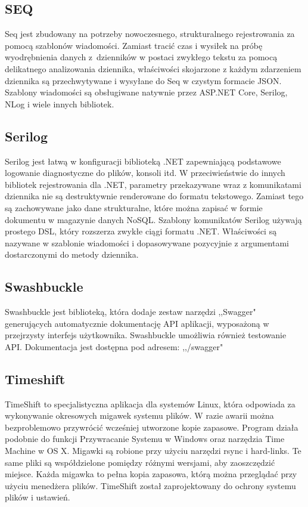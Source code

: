 \documentclass[12pt,a4paper]{article}
\begin{document}
		\subsection{SEQ}
			\indent Seq jest zbudowany na potrzeby nowoczesnego, strukturalnego rejestrowania za pomocą szablonów wiadomości. Zamiast tracić czas i wysiłek na próbę
				wyodrębnienia danych z~dzienników w postaci zwykłego tekstu za pomocą delikatnego analizowania dziennika, właściwości skojarzone z każdym zdarzeniem
				dziennika są przechwytywane i wysyłane do Seq w czystym formacie JSON. Szablony wiadomości są obsługiwane natywnie przez ASP.NET Core, Serilog, NLog
				i wiele innych bibliotek. 

		\subsection{Serilog}
			\indent Serilog jest łatwą w konfiguracji biblioteką .NET zapewniającą podstawowe logowanie diagnostyczne do plików, konsoli itd. W przeciwieństwie do innych bibliotek
				rejestrowania dla .NET, parametry przekazywane wraz z komunikatami dziennika nie są destruktywnie renderowane do formatu tekstowego. Zamiast tego są zachowywane
				jako dane strukturalne, które można zapisać w formie dokumentu w magazynie danych NoSQL. Szablony komunikatów Serilog używają prostego DSL, który rozszerza
				zwykłe ciągi formatu .NET. Właściwości są nazywane w szablonie wiadomości i dopasowywane pozycyjnie z argumentami dostarczonymi do metody dziennika.
							 
		\subsection{Swashbuckle}
			\indent Swashbuckle jest biblioteką, która dodaje zestaw narzędzi ,,Swagger" generujących automatycznie dokumentację API aplikacji,
				wyposażoną w przejrzysty interfejs użytkownika. Swashbuckle umożliwia również testowanie API. Dokumentacja jest dostępna pod adresem: ,,/swagger"
		
		\subsection{Timeshift}
			\indent TimeShift to specjalistyczna aplikacja dla systemów Linux, która odpowiada za wykonywanie okresowych migawek systemu plików.
			W razie awarii można bezproblemowo przywrócić wcześniej utworzone kopie zapasowe. Program działa podobnie do funkcji Przywracanie Systemu w Windows oraz narzędzia
			Time Machine w OS X. Migawki są robione przy użyciu narzędzi rsync i hard-links. Te same pliki są współdzielone pomiędzy różnymi wersjami, aby zaoszczędzić miejsce.
			Każda migawka to pełna kopia zapasowa, którą można przeglądać przy użyciu menedżera plików. TimeShift został zaprojektowany do ochrony systemu plików i ustawień.
			
\end{document}
